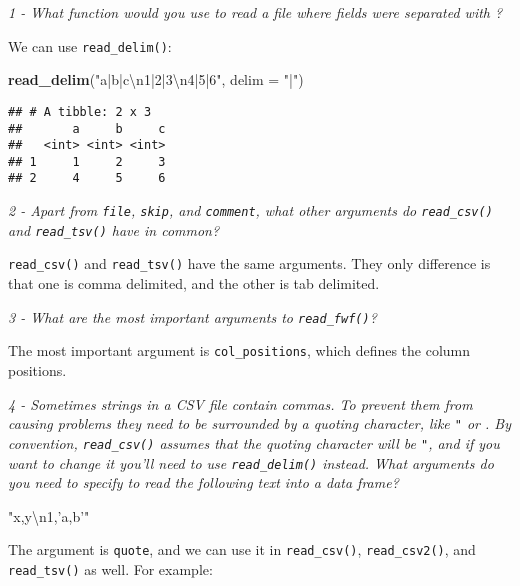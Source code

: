 \documentclass[]{article}
\newenvironment{Shaded}{\begin{snugshade}}{\end{snugshade}}
\newcommand{\KeywordTok}[1]{\textcolor[rgb]{0.13,0.29,0.53}{\textbf{#1}}}
\newcommand{\DataTypeTok}[1]{\textcolor[rgb]{0.13,0.29,0.53}{#1}}
\newcommand{\CharTok}[1]{\textcolor[rgb]{0.31,0.60,0.02}{#1}}
\newcommand{\StringTok}[1]{\textcolor[rgb]{0.31,0.60,0.02}{#1}}
\newcommand{\NormalTok}[1]{#1}
\theoremstyle{definition}
\theoremstyle{definition}
\theoremstyle{definition}
\theoremstyle{remark}
\begin{document}
\emph{1 - What function would you use to read a file where fields were
separated with \texttt{\textbar{}}?}

We can use \texttt{read\_delim()}:

\begin{Shaded}
\begin{Highlighting}[]
\KeywordTok{read_delim}\NormalTok{(}\StringTok{"a|b|c}\CharTok{\textbackslash{}n}\StringTok{1|2|3}\CharTok{\textbackslash{}n}\StringTok{4|5|6"}\NormalTok{, }\DataTypeTok{delim =} \StringTok{"|"}\NormalTok{)}
\end{Highlighting}
\end{Shaded}

\begin{verbatim}
## # A tibble: 2 x 3
##       a     b     c
##   <int> <int> <int>
## 1     1     2     3
## 2     4     5     6
\end{verbatim}

\emph{2 - Apart from \texttt{file}, \texttt{skip}, and \texttt{comment},
what other arguments do \texttt{read\_csv()} and \texttt{read\_tsv()}
have in common?}

\texttt{read\_csv()} and \texttt{read\_tsv()} have the same arguments.
They only difference is that one is comma delimited, and the other is
tab delimited.

\emph{3 - What are the most important arguments to
\texttt{read\_fwf()}?}

The most important argument is \texttt{col\_positions}, which defines
the column positions.

\emph{4 - Sometimes strings in a CSV file contain commas. To prevent
them from causing problems they need to be surrounded by a quoting
character, like \texttt{"} or \texttt{\textquotesingle{}}. By
convention, \texttt{read\_csv()} assumes that the quoting character will
be \texttt{"}, and if you want to change it you'll need to use
\texttt{read\_delim()} instead. What arguments do you need to specify to
read the following text into a data frame?}

\begin{Shaded}
\begin{Highlighting}[]
\StringTok{"x,y}\CharTok{\textbackslash{}n}\StringTok{1,'a,b'"}
\end{Highlighting}
\end{Shaded}

The argument is \texttt{quote}, and we can use it in
\texttt{read\_csv()}, \texttt{read\_csv2()}, and \texttt{read\_tsv()} as
well. For example:
\end{document}
